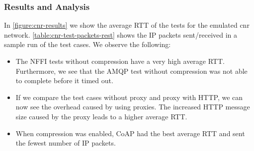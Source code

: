 \subsubsection{Results and Analysis}

In \cref{figure:cnr-results} we show the average RTT of the tests for the
emulated \gls{cnr} network. 
\cref{table:cnr-test-packets-rest} shows the IP packets sent/received in a sample
run of the test cases. We observe the following:

\begin{itemize}

    \item The NFFI tests without compression have a very high average RTT.
    Furthermore, we see that the AMQP test without compression was not able to
    complete before it timed out.

    \item If we compare the test cases without proxy and proxy with HTTP, we can
    now see the overhead caused by using proxies. The increased HTTP message
    size caused by the proxy leads to a higher average RTT.

    \item When compression was enabled, CoAP had the best average RTT and sent
    the fewest number of IP packets.

\end{itemize}

\begin{landscape}
    \begin{figure}
    \centering
    \begin{floatrow}
    \end{floatrow}
    \end{figure}
\end{landscape}

